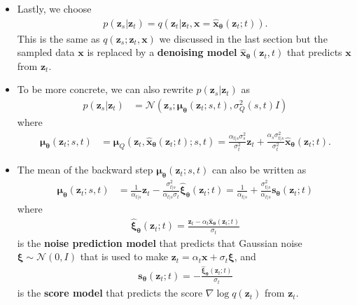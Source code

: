 \documentclass[10pt]{article}
\newcommand{\ve}[1]{\mathbf{#1}}
\newcommand{\ves}[1]{\boldsymbol{#1}}
\newcommand{\N}{\mathcal{N}}
\begin{document}
\begin{itemize}
  \item Lastly, we choose
  \begin{align*}
    p(\ve{z}_s|\ve{z}_t) = q(\ve{z}_t |\ve{z}_t, \ve{x} = \hat{\ve{x}}_{\ves{\theta}}(\ve{z}_t; t)).
  \end{align*}
  This is the same as $q(\ve{z}_s;\ve{z}_t, \ve{x})$ we discussed in the last section but the sampled data $\ve{x}$ is replaced by a {\bf denoising model} $\hat{\ve{x}}_{\ves{\theta}}(\ve{z}_t, t)$ that predicts $\ve{x}$ from $\ve{z}_t$. 
  
  \item To be more concrete, we can also rewrite $p(\ve{z}_s | \ve{z}_t)$ as
  \begin{align*}
    p(\ve{z}_s|\ve{z}_t) 
    &= \N(\ve{z}_s; \ves{\mu}_{\ves{\theta}}(\ve{z}_t; s, t), \sigma_Q^2(s,t) I)
  \end{align*}
  where
  \begin{align*}
    \ves{\mu}_{\ves{\theta}}(\ve{z}_t; s, t)
    &= \ves{\mu}_Q(\ve{z}_t, \hat{\ve{x}}_{\ves{\theta}}(\ve{z}_t; t); s, t)
    = \frac{\alpha_{t|s} \sigma_s^2}{\sigma_t^2} \ve{z}_t + \frac{\alpha_s \sigma_{t|s}^2}{\sigma_t^2} \hat{\ve{x}}_{\ves{\theta}}(\ve{z}_t; t).
  \end{align*}

  \item The mean of the backward step $\ves{\mu}_{\ves{\theta}}(\ve{z}_t; s, t)$ can also be written as
  \begin{align*}
    \ves{\mu}_{\ves{\theta}}(\ve{z}_t; s, t)
    &= \frac{1}{\alpha_{t|s}} \ve{z}_t - \frac{\sigma^2_{t|s}}{\alpha_{t|s}\sigma_t} \hat{\ves{\xi}}_{\ves{\theta}}(\ve{z}_t;t) 
    = \frac{1}{\alpha_{t|s}} + \frac{\sigma_{t|s}^2}{\alpha_{t|s}} \ve{s}_{\ves{\theta}}(\ve{z}_t; t)
  \end{align*}
  where
  \begin{align*}
    \hat{\ves{\xi}}_{\ves{\theta}}(\ve{z}_t;t) = \frac{\ve{z}_t - \alpha_t \hat{\ve{x}}_{\ves{\theta}}(\ve{z}_t;t)}{\sigma_t}
  \end{align*}
  is the {\bf noise prediction model} that predicts that Gaussian noise $\ves{\xi} \sim \N(0,I)$ that is used to make $\ve{z}_t = \alpha_t \ve{x} + \sigma_t \ves{\xi}$, and
  \begin{align*}
    \ve{s}_{\ves{\theta}}(\ve{z}_t;t) = -\frac{\hat{\ves{\xi}}_{\ves{\theta}}(\ve{z}_t; t)}{\sigma_t}
  \end{align*}
  is the {\bf score model} that predicts the score $\nabla \log q(\ve{z}_t)$ from $\ve{z}_t$.


\end{itemize}
\end{document}

